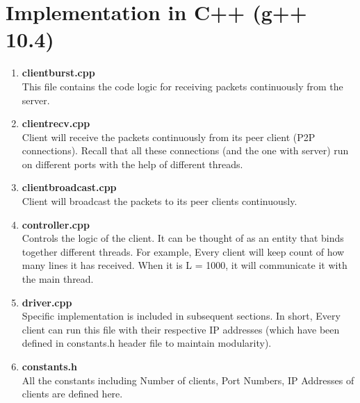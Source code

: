 \documentclass[12pt]{scrartcl}
\begin{document}
\section{Implementation in C++ (g++ 10.4)}
\begin{enumerate}
    \item \textbf{clientburst.cpp}\\
    This file contains the code logic for receiving packets continuously from the server.
    \item \textbf{clientrecv.cpp}\\
    Client will receive the packets continuously from its peer client (P2P connections). Recall that all these connections (and the one with server) run on different ports with the help of different threads.
    \item \textbf{clientbroadcast.cpp}\\
    Client will broadcast the packets to its peer clients continuously.
    \item \textbf{controller.cpp}\\
    Controls the logic of the client. It can be thought of as an entity that binds together different threads. For example, Every client will keep count of how many lines it has received. When it is L = 1000, it will communicate it with the main thread.
    \item \textbf{driver.cpp}\\
    Specific implementation is included in subsequent sections. In short, Every client can run this file with their respective IP addresses (which have been defined in constants.h header file to maintain modularity).
    \item \textbf{constants.h}\\
    All the constants including Number of clients, Port Numbers, IP Addresses of clients are defined here.
\end{enumerate}
\end{document}
